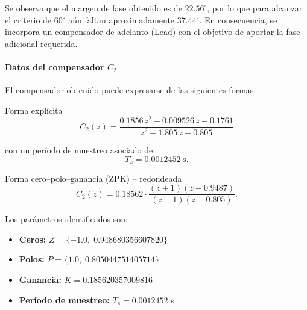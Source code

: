 Se observa que el margen de fase obtenido es de $22.56^\circ$, por lo que para alcanzar el criterio de $60^\circ$ aún faltan aproximadamente $37.44^\circ$. En consecuencia, se incorpora un compensador de adelanto (Lead) con el objetivo de aportar la fase adicional requerida.

\paragraph{Datos del compensador $C_2$}  

El compensador obtenido puede expresarse de las siguientes formas:  

Forma explícita
\[
C_2(z) = \frac{0.1856\,z^2 + 0.009526\,z - 0.1761}{z^2 - 1.805\,z + 0.805}
\]

con un período de muestreo asociado de:
\[
T_s = 0.0012452 \; \text{s}.
\]

Forma cero–polo–ganancia (ZPK) – redondeada  
\[
C_2(z) = 0.18562 \cdot \frac{(z+1)(z-0.9487)}{(z-1)(z-0.805)}.
\]

\noindent
Los parámetros identificados son:
\begin{itemize}
	\item \textbf{Ceros:} $Z = \{-1.0,\; 0.948680356607820\}$
	\item \textbf{Polos:} $P = \{1.0,\; 0.805044751405714\}$
	\item \textbf{Ganancia:} $K = 0.185620357009816$
	\item \textbf{Período de muestreo:} $T_s = 0.0012452$ s
\end{itemize}




